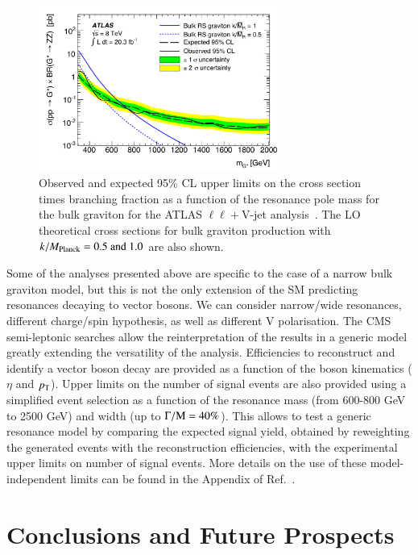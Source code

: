 \documentclass[3p,times,twocolumn]{elsarticle}
\begin{document}
\begin{figure}[htbp]
\centering
\includegraphics[width=8cm]{ATLAS_llVjet_limits.pdf}
\caption{Observed and expected 95\% CL upper limits on the cross
  section times branching fraction as a function of the resonance pole
  mass for the bulk graviton for the ATLAS $\ell\ell+$V-jet
  analysis~\cite{Aad:2014xka}. The LO theoretical cross sections for
  bulk graviton production with $k/M_{\rm{Planck}} = 0.5 \rm{~and~} 1.0$
  are also shown.}
\label{fig:ATLAS_llVjet_limits}
\end{figure}

Some of the analyses presented above are specific to the case of a 
narrow bulk graviton model, but this is not the only extension 
of the SM predicting resonances decaying to vector bosons. 
We can consider narrow/wide resonances, different charge/spin
hypothesis, as well as different V polarisation.
The CMS semi-leptonic searches allow the reinterpretation of the results
in a generic model greatly extending the versatility of the analysis.
Efficiencies to reconstruct and identify a vector boson decay are provided as 
a function of the boson kinematics ($\eta$ and
$p_{\rm{T}}$). Upper limits on the number of signal events are also
provided using a simplified event selection as a function of the
resonance mass (from 600-800 GeV to 2500 GeV) and width (up to
$\Gamma/\rm{M}=40\%$). 
This allows to test a generic resonance model by comparing the 
expected signal yield, obtained by reweighting the generated events with
the reconstruction efficiencies, with the experimental upper limits on
number of signal events. More details on the use of these model-independent limits 
can be found in the Appendix of Ref.~\cite{Khachatryan:2014gha}.

\section{Conclusions and Future Prospects}
\label{sec:Conclusion}
\end{document}
